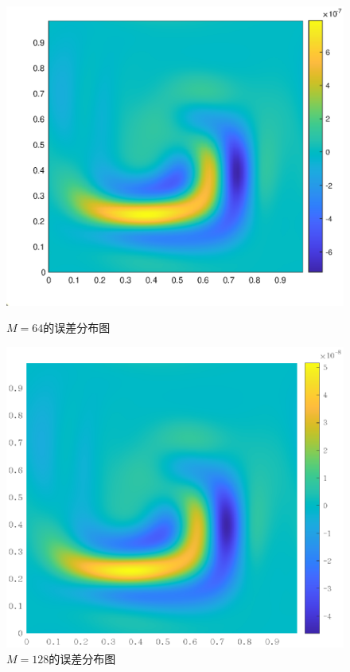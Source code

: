 \documentclass[lang=cn,10pt,bibend=bibtex]{elegantbook}
\begin{document}
\begin{figure}[H]
  \centering
  \begin{minipage}[t]{0.49\linewidth}
      \centering
      \includegraphics[width=0.9\linewidth]{figure/test2_error64.eps}
      \caption*{$M=64$的误差分布图}
  \end{minipage}
  \begin{minipage}[t]{0.49\linewidth}
    \centering
    \includegraphics[width=0.9\linewidth]{figure/test2_error128.eps}
      \caption*{$M=128$的误差分布图}
  \end{minipage}
\end{figure}
\end{document}
